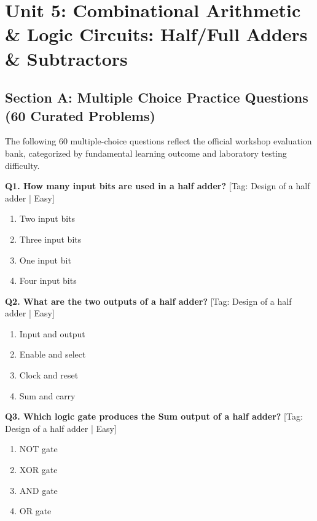 \chapter{Unit 5: Combinational Arithmetic \& Logic Circuits: Half/Full Adders \& Subtractors}

\section{Section A: Multiple Choice Practice Questions (60 Curated Problems)}

\noindent The following 60 multiple-choice questions reflect the official workshop evaluation bank, categorized by fundamental learning outcome and laboratory testing difficulty.\vspace{3mm}

\noindent\textbf{Q1. How many input bits are used in a half adder?} \hfill [Tag: Design of a half adder | Easy]
\begin{enumerate}[label=(\alph*),topsep=2pt,itemsep=1pt,partopsep=0pt,parsep=0pt]
    \item {Two input bits}
    \item {Three input bits}
    \item {One input bit}
    \item {Four input bits}
\end{enumerate}
\vspace{2mm}

\noindent\textbf{Q2. What are the two outputs of a half adder?} \hfill [Tag: Design of a half adder | Easy]
\begin{enumerate}[label=(\alph*),topsep=2pt,itemsep=1pt,partopsep=0pt,parsep=0pt]
    \item {Input and output}
    \item {Enable and select}
    \item {Clock and reset}
    \item {Sum and carry}
\end{enumerate}
\vspace{2mm}

\noindent\textbf{Q3. Which logic gate produces the Sum output of a half adder?} \hfill [Tag: Design of a half adder | Easy]
\begin{enumerate}[label=(\alph*),topsep=2pt,itemsep=1pt,partopsep=0pt,parsep=0pt]
    \item {NOT gate}
    \item {XOR gate}
    \item {AND gate}
    \item {OR gate}
\end{enumerate}
\vspace{2mm}

